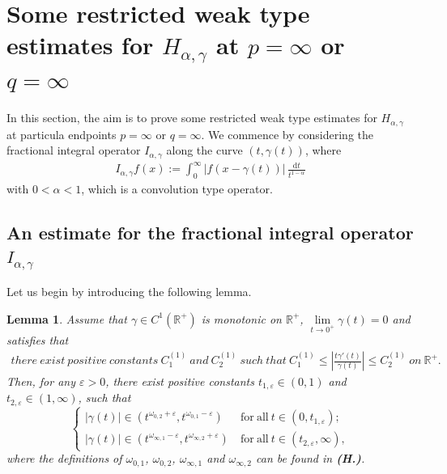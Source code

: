 \documentclass[11pt, twoside, leqno]{article}
\newtheorem{lemma}[theorem]{Lemma}
\theoremstyle{definition}
\numberwithin{equation}{section}
\begin{document}
\section{Some restricted weak type estimates for $H_{\alpha,\gamma}$ at $p=\infty$ or $q=\infty$}


In this section, the aim is to prove some restricted weak type estimates for $H_{\alpha,\gamma}$ at particula endpoints $p=\infty$ or $q=\infty$. We commence by considering the fractional integral operator $I_{\alpha,\gamma}$ along the curve $(t,\gamma(t))$, where
\begin{align}\label{eq:2.4}
I_{\alpha,\gamma}f(x):=\int_{0}^{\infty}\left|f(x-\gamma(t))\right|\,\frac{\textrm{d}t}{t^{1-\alpha}}
 \end{align}
with $0<\alpha<1$, which is a convolution type operator.

\subsection {An estimate for the fractional integral operator $I_{\alpha,\gamma}$}

Let us begin by introducing the following lemma.

\begin{lemma}\label{lemma 2.1}
Assume that $\gamma\in C^{1}(\mathbb{R}^+)$ is monotonic on $\mathbb{R}^+$, $\lim\limits_{t\rightarrow 0^+}\gamma(t)=0$ and satisfies that
\begin{align}\label{eq:2.1}
there~ exist~ positive ~constants~ C^{(1)}_1~ and~ C^{(1)}_2 ~such~ that~ C^{(1)}_1\leq\left|\frac{t\gamma'(t)}{\gamma(t)}\right|\leq C^{(1)}_2~ on~ \mathbb{R}^+.
\end{align}
Then, for any $\varepsilon>0$, there exist positive constants $t_{1,\varepsilon}\in(0,1)$ and $t_{2,\varepsilon}\in(1,\infty)$, such that
$$\begin{cases}
  |\gamma(t)|\in(t^{\omega_{0,2}+\varepsilon},t^{\omega_{0,1}-\varepsilon})~ &\textrm{for}~ \textrm{all} ~t\in(0,t_{1,\varepsilon}); \\
  |\gamma(t)|\in(t^{\omega_{\infty,1}-\varepsilon},t^{\omega_{\infty,2}+\varepsilon})~ &\textrm{for}~ \textrm{all} ~t\in(t_{2,\varepsilon},\infty),
 \end{cases}$$
where the definitions of $\omega_{0,1}$, $\omega_{0,2}$, $\omega_{\infty,1}$ and $\omega_{\infty,2}$ can be found in {\bf(H.)}.
\end{lemma}
\end{document}
